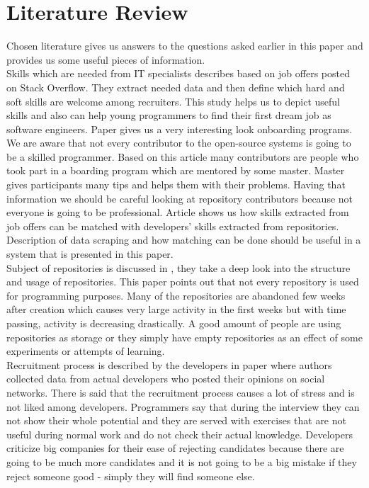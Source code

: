 \section{Literature Review}
Chosen literature gives us answers to the questions asked earlier in this paper and provides us some useful pieces of information. \\Skills which are needed from IT specialists describes \cite{StackOverflowStudies} based on job offers posted on Stack Overflow. They extract needed data and then define which hard and soft skills are welcome among recruiters. This study helps us to depict useful skills and also can help young programmers to find their first dream job as software engineers. Paper \cite{DoOnBoardingProgramsWork} gives us a very interesting look onboarding programs. We are aware that not every contributor to the open-source systems is going to be a skilled programmer. Based on this article many contributors are people who took part in a boarding program which are mentored by some master. Master gives participants many tips and helps them with their problems. Having that information we should be careful looking at repository contributors because not everyone is going to be professional. Article \cite{GitHubProfilesToJobAdv} shows us how skills extracted from job offers can be matched with developers' skills extracted from repositories. Description of data scraping and how matching can be done should be useful in a system that is presented in this paper.
\\Subject of repositories is discussed in \cite{MiningGitHub}, they take a deep look into the structure and usage of repositories. This paper points out that not every repository is used for programming purposes. Many of the repositories are abandoned few weeks after creation which causes very large activity in the first weeks but with time passing, activity is decreasing drastically. A good amount of people are using repositories as storage or they simply have empty repositories as an effect of some experiments or attempts of learning. 
\\Recruitment process is described by the developers in paper \cite{HiringIsBroken} where authors collected data from actual developers who posted their opinions on social networks. There is said that the recruitment process causes a lot of stress and is not liked among developers. Programmers say that during the interview they can not show their whole potential and they are served with exercises that are not useful during normal work and do not check their actual knowledge. Developers criticize big companies for their ease of rejecting candidates because there are going to be much more candidates and it is not going to be a big mistake if they reject someone good - simply they will find someone else.
